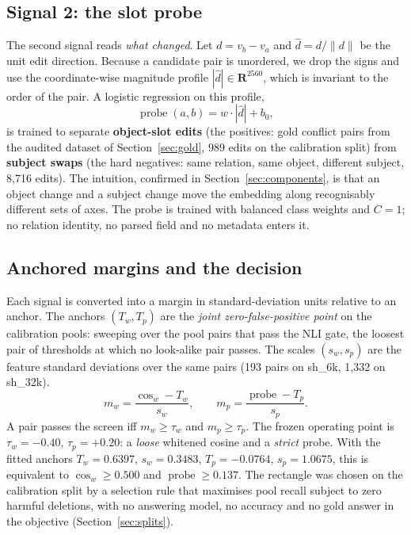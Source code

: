 \documentclass[journal=jcisd8,manuscript=article]{achemso}
\begin{document}
\subsection{Signal 2: the slot probe}
\label{sec:probe}

The second signal reads \emph{what changed}. Let $d=v_b-v_a$ and $\hat d=d/\lVert d\rVert$ be the unit edit direction. Because a candidate pair is unordered, we drop the signs and use the coordinate-wise magnitude profile $|\hat d|\in\mathbf{R}^{2560}$, which is invariant to the order of the pair. A logistic regression on this profile,
\begin{equation}
\operatorname{probe}(a,b)=w\cdot|\hat d|+b_0,
\end{equation}
is trained to separate \textbf{object-slot edits} (the positives: gold conflict pairs from the audited dataset of Section~\ref{sec:gold}, 989 edits on the calibration split) from \textbf{subject swaps} (the hard negatives: same relation, same object, different subject, 8,716 edits). The intuition, confirmed in Section~\ref{sec:components}, is that an object change and a subject change move the embedding along recognisably different sets of axes. The probe is trained with balanced class weights and $C=1$; no relation identity, no parsed field and no metadata enters it.

\subsection{Anchored margins and the decision}
\label{sec:margins}

Each signal is converted into a margin in standard-deviation units relative to an anchor. The anchors $(T_w,T_p)$ are the \emph{joint zero-false-positive point} on the calibration pools: sweeping over the pool pairs that pass the NLI gate, the loosest pair of thresholds at which no look-alike pair passes. The scales $(s_w,s_p)$ are the feature standard deviations over the same pairs (193 pairs on sh\_6k, 1,332 on sh\_32k).
\begin{equation}
m_w=\frac{\operatorname{cos}_w-T_w}{s_w},\qquad m_p=\frac{\operatorname{probe}-T_p}{s_p}.
\end{equation}
A pair passes the screen iff $m_w\geq\tau_w$ and $m_p\geq\tau_p$. The frozen operating point is $\tau_w=-0.40$, $\tau_p=+0.20$: a \emph{loose} whitened cosine and a \emph{strict} probe. With the fitted anchors $T_w=0.6397$, $s_w=0.3483$, $T_p=-0.0764$, $s_p=1.0675$, this is equivalent to $\operatorname{cos}_w\geq0.500$ and $\operatorname{probe}\geq0.137$. The rectangle was chosen on the calibration split by a selection rule that maximises pool recall subject to zero harmful deletions, with no answering model, no accuracy and no gold answer in the objective (Section~\ref{sec:splits}).
\end{document}
